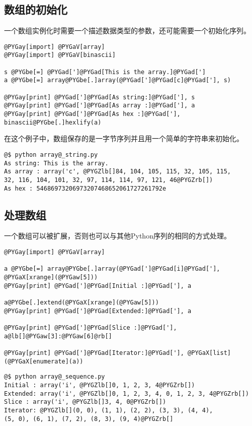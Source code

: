 \documentclass[a4paper,10pt,english]{manual}
\begin{document}
\subsection{数组的初始化}

一个数组实例化时需要一个描述数据类型的参数，还可能需要一个初始化序列。

\begin{Verbatim}[commandchars=@\[\]]
@PYGay[import] @PYGaV[array]
@PYGay[import] @PYGaV[binascii]

s @PYGbe[=] @PYGad[']@PYGad[This is the array.]@PYGad[']
a @PYGbe[=] array@PYGbe[.]array(@PYGad[']@PYGad[c]@PYGad['], s)

@PYGay[print] @PYGad[']@PYGad[As string:]@PYGad['], s
@PYGay[print] @PYGad[']@PYGad[As array :]@PYGad['], a
@PYGay[print] @PYGad[']@PYGad[As hex :]@PYGad['], binascii@PYGbe[.]hexlify(a)
\end{Verbatim}

在这个例子中，数组保存的是一字节序列并且用一个简单的字符串来初始化。

\begin{Verbatim}[commandchars=@\[\]]
@$ python array@_string.py
As string: This is the array.
As array : array('c', @PYGZlb[]84, 104, 105, 115, 32, 105, 115,
32, 116, 104, 101, 32, 97, 114, 114, 97, 121, 46@PYGZrb[])
As hex : 54686973206973207468652061727261792e
\end{Verbatim}


\subsection{处理数组}

一个数组可以被扩展，否则也可以与其他Python序列的相同的方式处理。

\begin{Verbatim}[commandchars=@\[\]]
@PYGay[import] @PYGaV[array]

a @PYGbe[=] array@PYGbe[.]array(@PYGad[']@PYGad[i]@PYGad['], @PYGaX[xrange](@PYGaw[5]))
@PYGay[print] @PYGad[']@PYGad[Initial :]@PYGad['], a

a@PYGbe[.]extend(@PYGaX[xrange](@PYGaw[5]))
@PYGay[print] @PYGad[']@PYGad[Extended:]@PYGad['], a

@PYGay[print] @PYGad[']@PYGad[Slice :]@PYGad['], a@lb[]@PYGaw[3]:@PYGaw[6]@rb[]

@PYGay[print] @PYGad[']@PYGad[Iterator:]@PYGad['], @PYGaX[list](@PYGaX[enumerate](a))
\end{Verbatim}

\begin{Verbatim}[commandchars=@\[\]]
@$ python array@_sequence.py
Initial : array('i', @PYGZlb[]0, 1, 2, 3, 4@PYGZrb[])
Extended: array('i', @PYGZlb[]0, 1, 2, 3, 4, 0, 1, 2, 3, 4@PYGZrb[])
Slice : array('i', @PYGZlb[]3, 4, 0@PYGZrb[])
Iterator: @PYGZlb[](0, 0), (1, 1), (2, 2), (3, 3), (4, 4),
(5, 0), (6, 1), (7, 2), (8, 3), (9, 4)@PYGZrb[]
\end{Verbatim}
\end{document}
